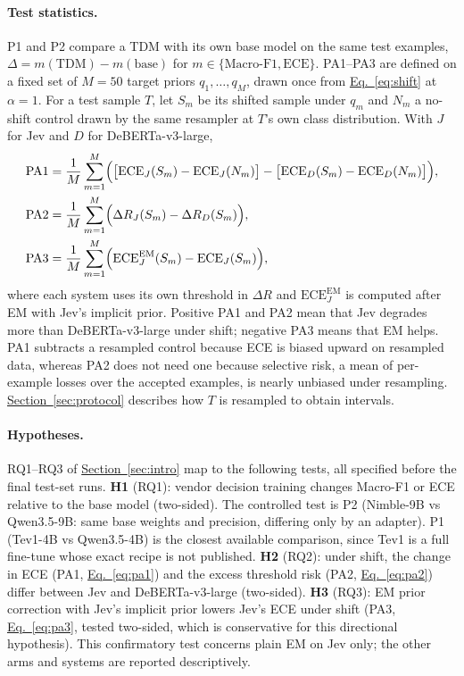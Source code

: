 \paragraph{Test statistics.}
P1 and P2 compare a TDM with its own base model on the same test examples, $\Delta=m(\mathrm{TDM})-m(\mathrm{base})$ for
$m\in\{\text{Macro-F1},\mathrm{ECE}\}$. PA1--PA3 are defined on a fixed set of $M=50$ target priors $q_1,\dots,q_M$,
drawn once from \hyperref[eq:shift]{Eq.~\ref*{eq:shift}} at $\alpha=1$. For a test sample $T$, let $S_m$ be its shifted sample under $q_m$ and
$N_m$ a no-shift control drawn by the same resampler at $T$'s own class distribution. With $J$ for Jev and $D$ for
DeBERTa-v3-large,
\begin{align}
  \mathrm{PA1}&=\frac{1}{M}\sum_{m=1}^{M}\Bigl(\bigl[\mathrm{ECE}_J(S_m)-\mathrm{ECE}_J(N_m)\bigr]
    -\bigl[\mathrm{ECE}_D(S_m)-\mathrm{ECE}_D(N_m)\bigr]\Bigr),\label{eq:pa1}\\
  \mathrm{PA2}&=\frac{1}{M}\sum_{m=1}^{M}\Bigl(\Delta R_J(S_m)-\Delta R_D(S_m)\Bigr),\label{eq:pa2}\\
  \mathrm{PA3}&=\frac{1}{M}\sum_{m=1}^{M}\Bigl(\mathrm{ECE}^{\mathrm{EM}}_J(S_m)-\mathrm{ECE}_J(S_m)\Bigr),\label{eq:pa3}
\end{align}
where each system uses its own threshold in $\Delta R$ and $\mathrm{ECE}^{\mathrm{EM}}_J$ is computed after EM with
Jev's implicit prior. Positive PA1 and PA2 mean that Jev degrades more than DeBERTa-v3-large under shift; negative PA3
means that EM helps. PA1 subtracts a resampled control because ECE is biased upward on resampled data, whereas PA2 does
not need one because selective risk, a mean of per-example losses over the accepted examples, is nearly unbiased under
resampling. \hyperref[sec:protocol]{Section~\ref*{sec:protocol}} describes how $T$ is
resampled to obtain intervals.

\paragraph{Hypotheses.}
RQ1--RQ3 of \hyperref[sec:intro]{Section~\ref*{sec:intro}} map to the following tests, all specified before the final
test-set runs.
\textbf{H1} (RQ1): vendor decision training changes Macro-F1 or ECE relative to the base model (two-sided). The
controlled test is P2 (Nimble-9B vs Qwen3.5-9B: same base weights and precision, differing only by an adapter). P1
(Tev1-4B vs Qwen3.5-4B) is the closest available comparison, since Tev1 is a full fine-tune whose exact recipe is not
published.
\textbf{H2} (RQ2): under shift, the change in ECE (PA1, \hyperref[eq:pa1]{Eq.~\ref*{eq:pa1}}) and the excess threshold risk (PA2,
\hyperref[eq:pa2]{Eq.~\ref*{eq:pa2}}) differ between Jev and DeBERTa-v3-large (two-sided).
\textbf{H3} (RQ3): EM prior correction with Jev's implicit prior lowers Jev's ECE under shift (PA3, \hyperref[eq:pa3]{Eq.~\ref*{eq:pa3}},
tested two-sided, which is conservative for this directional hypothesis). This confirmatory test concerns plain EM on
Jev only; the other arms and systems are reported descriptively.

